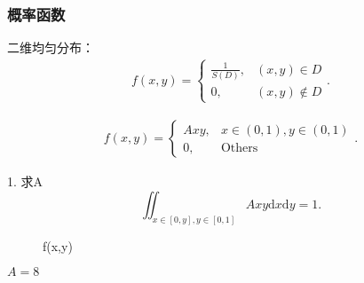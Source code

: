 \subsubsection*{概率函数}%
\label{subsub:概率函数}
\begin{notation}
    二维均匀分布：
    \begin{align*}
        f\left( x,y \right) =\begin{cases}
            \displaystyle{\frac{1}{S\left( D \right) }},&\left( x,y \right) \in D\\
            0 ,& \left( x,y \right) \not\in D
        \end{cases}
    .\end{align*}
\end{notation}
\begin{eg}
    \begin{align*}
        f\left( x,y \right) =\begin{cases}
            Axy,&x\in \left( 0,1 \right) ,y\in \left( 0,1 \right) \\
            0,&\text{Others}
        \end{cases}
    .\end{align*}

    1. 求A
    \[
        \iint_{x\in [0,y] ,y\in [0,1] } Axy \mathrm{d}x\mathrm{d}y=1
    .\] 
    \begin{figure}[htbp]
        \centering
        \caption{f(x,y)}
        \label{f( x,y )}
    \end{figure}

    $A=8$


\end{eg}
